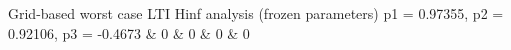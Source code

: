 Grid-based worst case LTI Hinf analysis (frozen parameters) p1 = 0.97355, p2 = 0.92106, p3 = -0.4673 
	& 0 & 0 & 0 & 0 \\